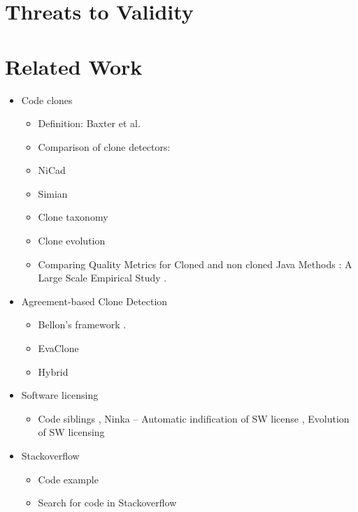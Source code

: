 \documentclass{sig-alternate-05-2015}
\begin{document}
\section{Threats to Validity}

\section{Related Work}
\begin{itemize}
	\item Code clones 
		\begin{itemize}
			\item Definition: Baxter et al. \cite{Baxter1998}
			\item Comparison of clone detectors: \cite{Roy2008, Ragkhitwetsagul2016,Svajlenko2014}
			\item NiCad \cite{Roy2008,Cordy}
			\item Simian \cite{simian}
			\item Clone taxonomy \cite{Kapser2003}
			\item Clone evolution \cite{Pate2013,Mondal2011}
			\item Comparing Quality Metrics for Cloned and non cloned Java Methods : A Large Scale Empirical Study \cite{Saini2016}.
		\end{itemize}
	\item Agreement-based Clone Detection
	\begin{itemize}
		\item Bellon's framework \cite{Bellon2007}.
		\item EvaClone \cite{Wang2013}
		\item Hybrid \cite{Funaro2010}
	\end{itemize}
	\item Software licensing
	\begin{itemize}
		\item Code siblings \cite{German2009}, Ninka -- Automatic indification of SW license \cite{German2010}, Evolution of SW licensing \cite{DiPenta2010}
	\end{itemize}

	\item Stackoverflow
	\begin{itemize}
		\item Code example \cite{Nasehi2012}
		\item Search for code in Stackoverflow \cite{Diamantopoulos2015,Keivanloo2014,Park2014}
	\end{itemize}
\end{itemize}
\end{document}
